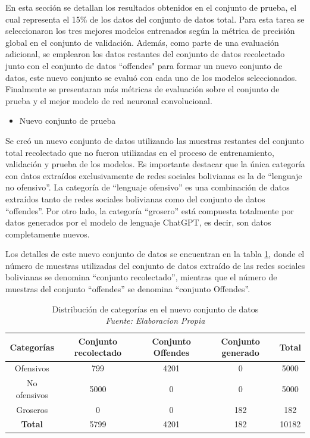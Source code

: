 En esta sección se detallan los resultados obtenidos en el conjunto de prueba, el cual representa el 15\% de los datos del conjunto de datos total. Para esta tarea se seleccionaron los tres mejores modelos entrenados según la métrica de precisión global en el conjunto de validación. Además, como parte de una evaluación adicional, se emplearon los datos restantes del conjunto de datos recolectado junto con el conjunto de datos “offendes" para formar un nuevo conjunto de datos, este nuevo conjunto se evaluó con cada uno de los modelos seleccionados. Finalmente se presentaran más métricas de evaluación sobre el conjunto de prueba y el mejor modelo de red neuronal convolucional.

\begin{itemize}
\item Nuevo conjunto de prueba
\end{itemize}
Se creó un nuevo conjunto de datos utilizando las muestras restantes del conjunto total recolectado que no fueron utilizadas en el proceso de entrenamiento, validación y prueba de los modelos. Es importante destacar que la única categoría con datos extraídos exclusivamente de redes sociales bolivianas es la de ``lenguaje no ofensivo''. La categoría de ``lenguaje ofensivo'' es una combinación de datos extraídos tanto de redes sociales bolivianas como del conjunto de datos ``offendes''. Por otro lado, la categoría ``grosero'' está compuesta totalmente por datos generados por el modelo de lenguaje ChatGPT, es decir, son datos completamente nuevos.

Los detalles de este nuevo conjunto de datos se encuentran en la tabla \ref{tbl:categorias}, donde el número de muestras utilizadas del conjunto de datos extraído de las redes sociales bolivianas se denomina ``conjunto recolectado'', mientras que el número de muestras del conjunto ``offendes'' se denomina ``conjunto Offendes''.

\begin{table}[!ht]
	\centering
	\begin{tabular}{|c|c|c|c|c|}
		\hline
		\textbf{Categorías} & \textbf{Conjunto recolectado} & \textbf{Conjunto Offendes} & \textbf{Conjunto generado} & \textbf{Total} \\ \hline
		Ofensivos & 799 & 4201 & 0 & 5000 \\ \hline
		No ofensivos & 5000 & 0 & 0 & 5000 \\ \hline
		Groseros & 0 & 0 & 182 & 182 \\ \hline
		\textbf{Total} & 5799 & 4201 & 182 & 10182 \\ \hline
	\end{tabular}
	\caption{Distribución de categorías en el nuevo conjunto de datos
		\\\textit{Fuente: Elaboracion Propia}}
	\label{tbl:categorias}
\end{table}

